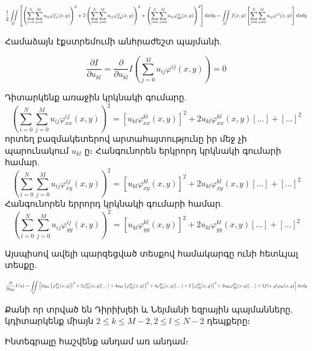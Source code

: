 \documentclass[fleqn, bachelor,subf,12pt,notitlepage]{article}
\newcommand\scalemath[2]{\scalebox{#1}{\mbox{\ensuremath{\displaystyle #2}}}}
\begin{document}
$$\scalemath{0.7}{\frac{1}{2} \iint \limits_{D}\left[\left(\sum_{i=0}^{N} \sum_{j=0}^{M}u_{ij}\varphi^{ij}_{xx}(x,y)\right)^2 +  2\left(\sum_{i=0}^{N} \sum_{j=0}^{M}u_{ij}\varphi^{ij}_{xy}(x,y)\right)^2 + \left(\sum_{i=0}^{N} \sum_{j=0}^{M}u_{ij}\varphi^{ij}_{yy}(x,y)\right)^2\right]dxdy - \iint \limits_{D}f(x,y)\left[ \sum_{i=0}^{N} \sum_{j=0}^{M}u_{ij}\varphi^{ij}(x,y)\right]dxdy}$$


\noindent  Համաձայն էքստրեմումի անհրաժեշտ պայմանի.

$$\dfrac{\partial I}{ \partial u_{kl}} = \dfrac{\partial}{\partial u_{kl}} I \left(\sum_{j=0}^{M} u_{ij}\varphi^{ij}(x,y)\right) = 0 $$


\noindent Դիտարկենք առաջին կրկնակի գումարը.
$$\left(\sum_{i=0}^{N} \sum_{j=0}^{M}u_{ij}\varphi_{xx}^{ij}(x,y)\right)^2 = \left[u_{kl}\varphi_{xx}^{kl}(x,y)\right]^{2} + 2u_{kl}\varphi_{xx}^{kl}(x,y)[\dots] + [\dots]^2$$
\noindent որտեղ բազմակետերով արտահայտությունը իր մեջ չի պարունակում $u_{kl}$ ը։
Հանգունորեն երկրորդ կրկնակի գումարի համար.
$$\left(\sum_{i=0}^{N} \sum_{j=0}^{M}u_{ij}\varphi_{xy}^{ij}(x,y)\right)^2 = \left[u_{kl}\varphi_{xy}^{kl}(x,y)\right]^{2} + 2u_{kl}\varphi_{xy}^{kl}(x,y)[\dots] + [\dots]^2$$
Հանգունորեն երրորդ կրկնակի գումարի համար.
$$\left(\sum_{i=0}^{N} \sum_{j=0}^{M}u_{ij}\varphi_{yy}^{ij}(x,y)\right)^2 = \left[u_{kl}\varphi_{yy}^{kl}(x,y)\right]^{2} + 2u_{kl}\varphi_{yy}^{kl}(x,y)[\dots] + [\dots]^2$$



\noindent Այսպիսով ավելի պարզեցված տեսքով համակարգը ունի հետևյալ տեսքը.

$$\scalemath{0.65}{\frac{\partial}{\partial u_{kl}}I \left(u\right)= \iint \limits_{D} \left[2u_{kl}\left\{ \varphi_{xx}^{kl}(x,y)\right\}^{2} + 2\varphi_{xx}^{kl}(x,y)[\dots] + 4u_{kl}\left\{ \varphi_{xy}^{kl}(x,y)\right\}^{2} + 4\varphi_{xy}^{kl}(x,y)[\dots] + 2\left\{ \varphi_{yy}^{kl}(x,y)\right\}^{2} + 2u_{kl}\varphi_{yy}^{kl}(x,y)[\dots] + 2f(x,y)\varphi_{kl}(x,y)\right]dxdy}$$

Քանի որ տրված են Դիրիխլեի և Նեյմանի եզրային պայմանները, կդիտարկենք միայն $2 \leq k \leq M-2, 2 \leq l \leq N-2$ դեպքերը։ 

\noindent Ինտեգրալը հաշվենք անդամ առ անդամ։
\end{document}
